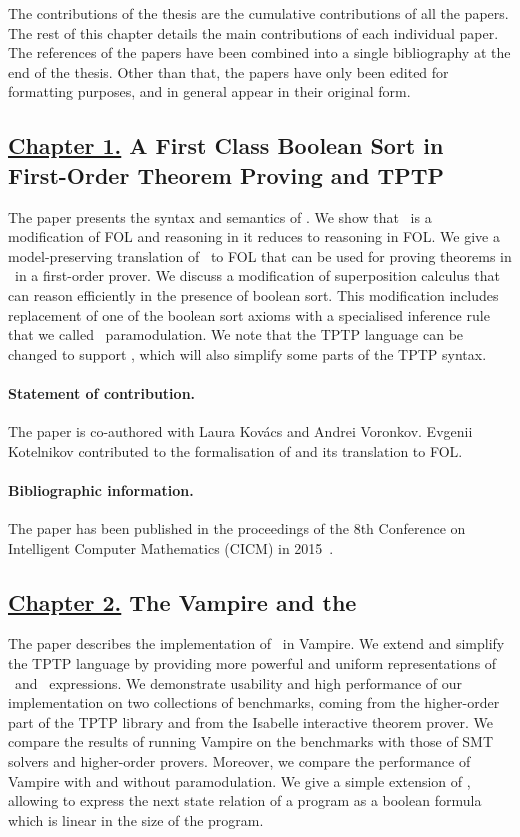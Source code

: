 The contributions of the thesis are the cumulative contributions of all the papers. The rest of this chapter details the main contributions of each individual paper. The references of the papers have been combined into a single bibliography at the end of the thesis. Other than that, the papers have only been edited for formatting purposes, and in general appear in their original form.

\subsection*{\hyperref[chap:fool]{Chapter 1.} A First Class Boolean Sort in\\First-Order Theorem Proving and TPTP}
The paper presents the syntax and semantics of \folb. We show that \folb\ is a modification of FOL and reasoning in it reduces to reasoning in FOL. We give a model-preserving \iffalse(modulo introduced definitions)\fi translation of \folb\ to FOL that can be used for proving theorems in \folb\ in a first-order prover. We discuss a modification of superposition calculus that can reason efficiently in the presence of boolean sort. This modification includes replacement of one of the boolean sort axioms with a specialised inference rule that we called \folb\ paramodulation. We note that the TPTP language can be changed to support \folb, which will also simplify some parts of the TPTP syntax. 

\paragraph{Statement of contribution.} The paper is co-authored with Laura Kov\'{a}cs and Andrei Voronkov. Evgenii Kotelnikov contributed to the formalisation of \folb{} and its translation to FOL.

\paragraph{Bibliographic information.} The paper has been published in the proceedings of the 8th Conference on Intelligent Computer Mathematics (CICM) in 2015~\cite{FOOL}.

\subsection*{\hyperref[chap:implementation]{Chapter 2.} The Vampire and the \folb{}}
The paper describes the implementation of \folb\ in Vampire. We extend and simplify the TPTP language by providing more powerful and uniform representations of \ITE\ and \LETIN\ expressions. We demonstrate usability and high performance of our implementation on two collections of benchmarks, coming from the higher-order part of the TPTP library and from the Isabelle interactive theorem prover. We compare the results of running Vampire on the benchmarks with those of SMT solvers and higher-order provers. Moreover, we compare the performance of Vampire with and without \folb{} paramodulation. We give a simple extension of \folb, allowing to express the next state relation of a program as a boolean formula which is linear in the size of the program.


